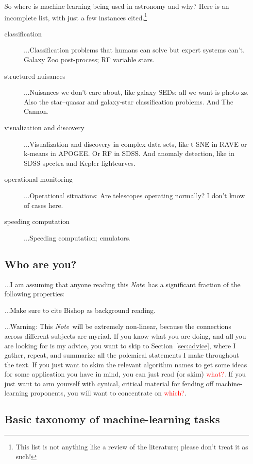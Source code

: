 \documentclass[12pt, twoside, letterpaper]{article}
\newcommand{\documentname}{\textsl{Note}}
\newcommand{\sectionname}{Section}
\newcommand{\todo}[1]{\textcolor{red}{#1}}  %
\begin{document}
So where is machine learning being used in astronomy and why?  Here is
an incomplete list, with just a few instances cited.\footnote{This
  list is not anything like a review of the literature; please don't
  treat it as such!}
\begin{description}
\item[classification]
...Classification problems that humans can solve but expert systems
can't. Galaxy Zoo post-process; RF variable stars.
\item[structured nuisances]
...Nuisances we don't care about, like galaxy SEDs; all we want is
photo-zs. Also the star--quasar and galaxy-star classification
problems. And The Cannon.
\item[visualization and discovery]
...Visualization and discovery in complex data sets, like t-SNE in RAVE
or k-means in APOGEE. Or RF in SDSS. And anomaly detection, like in SDSS
spectra and Kepler lightcurves.
\item[operational monitoring]
...Operational situations: Are telescopes operating normally? I don't know
of cases here.
\item[speeding computation]
...Speeding computation; emulators.
\end{description}

\subsection{Who are you?}

...I am assuming that anyone reading this \documentname\ has a
significant fraction of the following properties:

...Make sure to cite Bishop as background reading.

...Warning: This \documentname\ will be extremely non-linear, because
the connections across different subjects are myriad. If you know what
you are doing, and all you are looking for is my advice, you
want to skip to \sectionname~\ref{sec:advice}, where I gather, repeat,
and summarize all the polemical statements I make throughout the text.
If you just want to skim the relevant
algorithm names to get some ideas for some application you have in
mind, you can just read (or skim) \todo{what?}. If you just want to arm
yourself with cynical, critical material for fending off machine-learning
proponents, you will want to concentrate on \todo{which?}.

\subsection{Basic taxonomy of machine-learning tasks}
\end{document}
